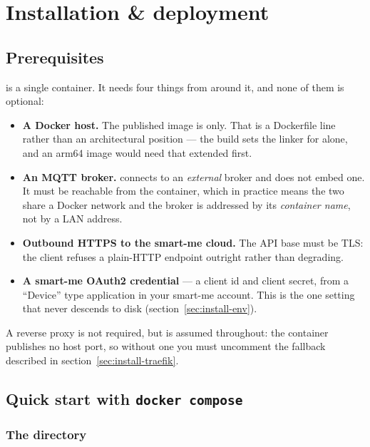 \chapter{Installation \& deployment}
\label{ch:install}

\section{Prerequisites}

\prog is a single container. It needs four things from around it, and none of them
is optional:

\begin{itemize}
  \item \textbf{A Docker host.} The published image is  only. That
        is a Dockerfile line rather than an architectural position --- the build sets
        the  linker for  alone, and an
        arm64 image would need that extended first.
  \item \textbf{An MQTT broker.} \prog connects to an \emph{external} broker and does
        not embed one. It must be reachable from the container, which in practice
        means the two share a Docker network and the broker is addressed by its
        \emph{container name}, not by a LAN address.
  \item \textbf{Outbound HTTPS to the smart-me cloud.} The API base must be TLS: the
        client refuses a plain-HTTP endpoint outright rather than degrading.
  \item \textbf{A smart-me OAuth2 credential} --- a client id and client secret, from
        a ``Device'' type application in your smart-me account. This is the one
        setting that never descends to disk (section~\ref{sec:install-env}).
\end{itemize}

A reverse proxy is not required, but is assumed throughout: the container publishes
no host port, so without one you must uncomment the  fallback described
in section~\ref{sec:install-traefik}.

\section{Quick start with \texttt{docker compose}}
\label{sec:install-quickstart}

\subsection{The directory}

